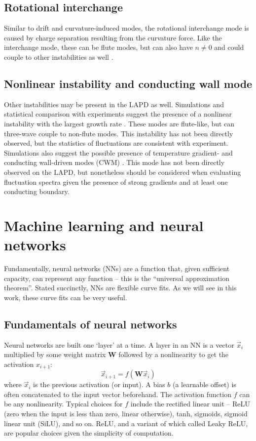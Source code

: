\subsection{Rotational interchange}

Similar to drift and curvature-induced modes, the rotational interchange mode is caused by charge separation resulting from the curvature force. Like the interchange mode, these can be flute modes, but can also have $n \neq 0$ and could couple to other instabilities as well \cite{Friedman_simulation_2013}.

\subsection{Nonlinear instability and conducting wall mode}

Other instabilities may be present in the LAPD as well. Simulations and statistical comparison with experiments suggest the presence of a nonlinear instability with the largest growth rate \cite{Friedman_2013}. These modes are flute-like, but can three-wave couple to non-flute modes. This instability has not been directly observed, but the statistics of fluctuations are consistent with experiment. Simulations also suggest the possible presence of temperature gradient- and conducting wall-driven modes (CWM) \cite{Friedman_2013, Berk_1991}. This mode has not been directly observed on the LAPD, but nonetheless should be considered when evaluating fluctuation spectra given the presence of strong gradients and at least one conducting boundary.

\section{Machine learning and neural networks}

Fundamentally, neural networks (NNs) are a function that, given sufficient capacity, can represent any function -- this is the ``universal approximation theorem''. Stated succinctly, NNs are flexible curve fits. As we will see in this work, these curve fits can be very useful.

\subsection{Fundamentals of neural networks}

Neural networks are built one `layer' at a time. A layer in an NN is a vector $\vec x_i$ multiplied by some weight matrix $\mathbf{W}$ followed by a nonlinearity to get the activation $x_{i+1}$:
\begin{equation}
	\vec x_{i+1} = f( \mathbf{W} \vec x_i)
\end{equation}
where $\vec x_i$ is the previous activation (or input). A bias $b$ (a learnable offset) is often concatenated to the input vector beforehand. The activation function $f$ can be any nonlinearity. Typical choices for $f$ include the rectified linear unit -- ReLU (zero when the input is less than zero, linear otherwise), tanh, sigmoids, sigmoid linear unit (SiLU), and so on. ReLU, and a variant of which called Leaky ReLU, are popular choices given the simplicity of computation.


